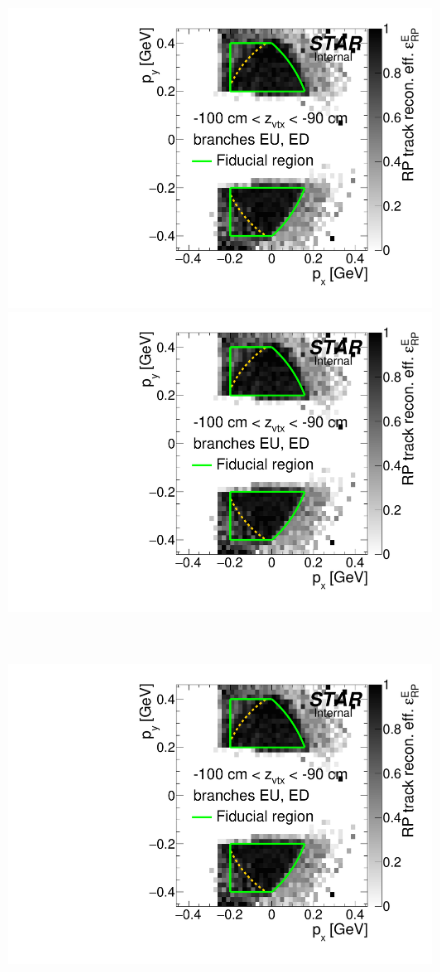 \begin{figure}[hb]\ContinuedFloat
\centering
\parbox{0.495\textwidth}{
  \centering
  \includegraphics[width=\linewidth,page=15]{graphics/corrections/mcEffPxPy.pdf}\\
  \includegraphics[width=\linewidth,page=17]{graphics/corrections/mcEffPxPy.pdf}
}~
\parbox{0.495\textwidth}{
  \centering
  \includegraphics[width=\linewidth,page=16]{graphics/corrections/mcEffPxPy.pdf}\\
}
\end{figure}
